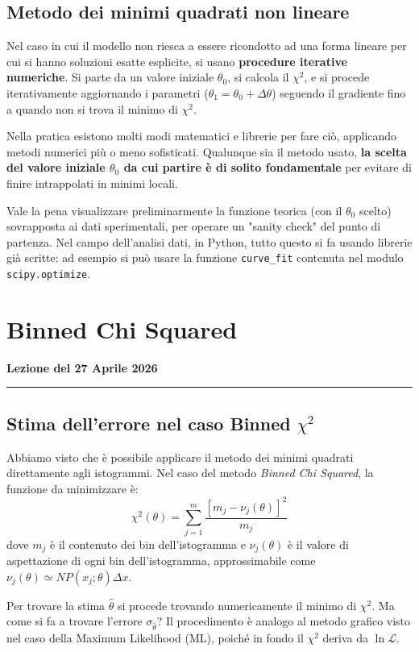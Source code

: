 \documentclass[openany,a4paper,12pt]{book}
\theoremstyle{remark}
\newcommand{\thelezione}{}
\newcommand{\lezione}[2]{
\newpage
\renewcommand{\thelezione}{#2} 
\section{#1} 
\noindent\textbf{\color{RoyalBlue}Lezione del #2}\par\vspace{0.5em}\hrule\vspace{1em}
}
\begin{document}
\subsection*{Metodo dei minimi quadrati non lineare}
Nel caso in cui il modello non riesca a essere ricondotto ad una forma lineare per cui si hanno soluzioni esatte esplicite, si usano \textbf{procedure iterative numeriche}.
Si parte da un valore iniziale $\theta_0$, si calcola il $\chi^2$, e si procede iterativamente aggiornando i parametri ($\theta_1 = \theta_0 + \Delta \theta$) seguendo il gradiente fino a quando non si trova il minimo di $\chi^2$.

Nella pratica esistono molti modi matematici e librerie per fare ciò, applicando metodi numerici più o meno sofisticati. Qualunque sia il metodo usato, \textbf{la scelta del valore iniziale $\theta_0$ da cui partire è di solito fondamentale} per evitare di finire intrappolati in minimi locali.

Vale la pena visualizzare preliminarmente la funzione teorica (con il $\theta_0$ scelto) sovrapposta ai dati sperimentali, per operare un "sanity check" del punto di partenza. 
Nel campo dell'analisi dati, in Python, tutto questo si fa usando librerie già scritte: ad esempio si può usare la funzione \texttt{curve\_fit} contenuta nel modulo \texttt{scipy.optimize}. 

\lezione{Binned Chi Squared}{27 Aprile 2026}
\subsection*{Stima dell'errore nel caso Binned $\chi^2$}

Abbiamo visto che è possibile applicare il metodo dei minimi quadrati direttamente agli istogrammi. Nel caso del metodo \textit{Binned Chi Squared}, la funzione da minimizzare è:
\begin{equation}
    \chi^2(\theta) = \sum_{j=1}^m \frac{[m_j - \nu_j(\theta)]^2}{m_j}
\end{equation}
dove $m_j$ è il contenuto dei bin dell'istogramma e $\nu_j(\theta)$ è il valore di aspettazione di ogni bin dell'istogramma, approssimabile come $\nu_j(\theta) \simeq N P(x_j; \theta) \Delta x$.

Per trovare la stima $\hat{\theta}$ si procede trovando numericamente il minimo di $\chi^2$. Ma come si fa a trovare l'errore $\sigma_{\hat{\theta}}$? Il procedimento è analogo al metodo grafico visto nel caso della Maximum Likelihood (ML), poiché in fondo il $\chi^2$ deriva da $\ln \mathcal{L}$.
\end{document}
